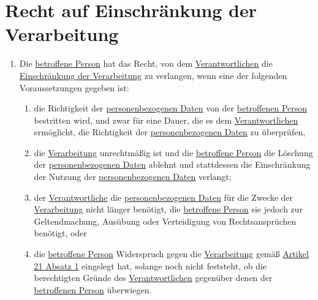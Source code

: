 \chapter{Recht auf Einschränkung der Verarbeitung}
\label{ch:18}


\begin{enumerate}

  \item Die \hyperref[itm:04-1]{betroffene Person} hat das Recht, von dem \hyperref[itm:04-7]{Verantwortlichen} die \hyperref[itm:04-3]{Einschränkung der Verarbeitung} zu verlangen,
   wenn eine der folgenden Voraussetzungen gegeben ist:
  \label{itm:18-1}

  \begin{enumerate}
  
    \item die Richtigkeit der \hyperref[itm:04-1]{personenbezogenen Daten} von der \hyperref[itm:04-1]{betroffenen Person} bestritten wird, und zwar für eine
     Dauer, die es dem \hyperref[itm:04-7]{Verantwortlichen} ermöglicht, die Richtigkeit der \hyperref[itm:04-1]{personenbezogenen Daten} zu überprüfen,
    \label{itm:18-1a}

    \item die \hyperref[itm:04-2]{Verarbeitung} unrechtmäßig ist und die \hyperref[itm:04-1]{betroffene Person} die Löschung der \hyperref[itm:04-1]{personenbezogenen Daten} ablehnt
     und stattdessen die Einschränkung der Nutzung der \hyperref[itm:04-1]{personenbezogenen Daten} verlangt;
    \label{itm:18-1b}

    \item der \hyperref[itm:04-7]{Verantwortliche} die \hyperref[itm:04-1]{personenbezogenen Daten} für die Zwecke der \hyperref[itm:04-2]{Verarbeitung} nicht länger benötigt, die
     \hyperref[itm:04-1]{betroffene Person} sie jedoch zur Geltendmachung, Ausübung oder Verteidigung von Rechtsansprüchen benötigt, oder
    \label{itm:18-1c}

    \item die \hyperref[itm:04-1]{betroffene Person} Widerspruch gegen die \hyperref[itm:04-2]{Verarbeitung} gemäß \hyperref[itm:21-1]{Artikel 21 Absatz 1}
     eingelegt hat, solange noch nicht feststeht, ob die berechtigten Gründe des \hyperref[itm:04-7]{Verantwortlichen} gegenüber denen der
     \hyperref[itm:04-1]{betroffenen Person} überwiegen.
    \label{itm:18-1d}

  \end{enumerate}


\end{enumerate}
